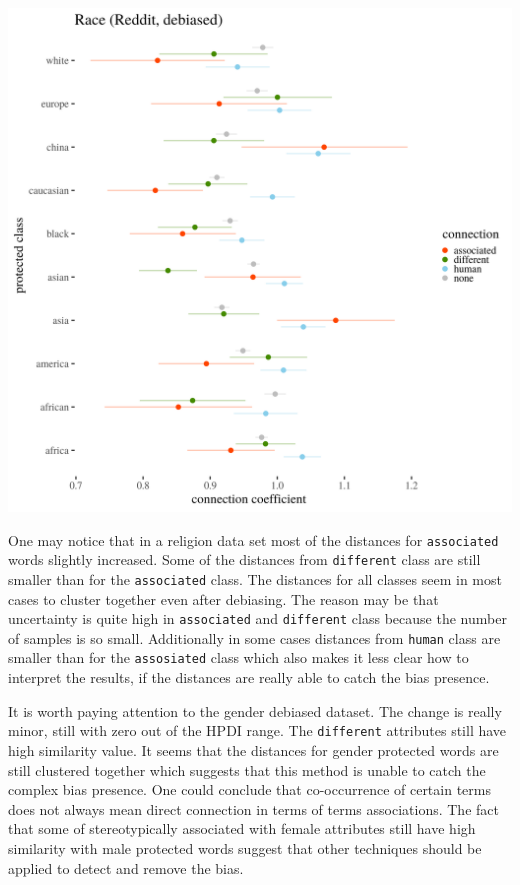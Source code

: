\documentclass[12pt,]{book}
\begin{document}
\includegraphics[width=14cm]{../images/visDebRaceReddit.png}

One may notice that in a religion data set most of the distances for
\texttt{associated} words slightly increased. Some of the distances from
\texttt{different} class are still smaller than for the
\texttt{associated} class. The distances for all classes seem in most
cases to cluster together even after debiasing. The reason may be that
uncertainty is quite high in \texttt{associated} and \texttt{different}
class because the number of samples is so small. Additionally in some
cases distances from \texttt{human} class are smaller than for the
\texttt{assosiated} class which also makes it less clear how to
interpret the results, if the distances are really able to catch the
bias presence.

It is worth paying attention to the gender debiased dataset. The change
is really minor, still with zero out of the HPDI range. The
\texttt{different} attributes still have high similarity value. It seems
that the distances for gender protected words are still clustered
together which suggests that this method is unable to catch the complex
bias presence. One could conclude that co-occurrence of certain terms
does not always mean direct connection in terms of terms associations.
The fact that some of stereotypically associated with female attributes
still have high similarity with male protected words suggest that other
techniques should be applied to detect and remove the bias.
\end{document}
